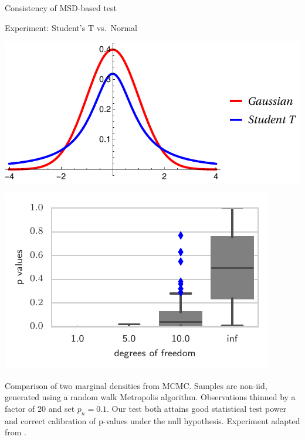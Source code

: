 \begin{frame}
\begin{columns}
\begin{column}{.32\linewidth}
\begin{block}{Consistency of MSD-based test}
\end{block}


\vspace{-0.75cm}
\begin{block}{Experiment: Student's T vs.\ Normal}

\begin{center}
\begin{minipage}{.45\linewidth}
\includegraphics[width=\textwidth]{../../presentation/img/nt}
\end{minipage}
\begin{minipage}{.45\linewidth}
 \includegraphics[width=\textwidth]{../../presentation/img/sgld_student_opt} 
\end{minipage}
\end{center}


Comparison of two marginal densities from MCMC. Samples are non-iid, generated using a random walk Metropolis algorithm.  Observations thinned by a factor of 20 and
set $p_{n}=0.1$. Our test both attains good statistical test power and
correct calibration of p-values under the null hypothesis. Experiment adapted from \cite{gorham2015measuring}. 


\end{block}
\end{column}
\end{columns}
\end{frame}
